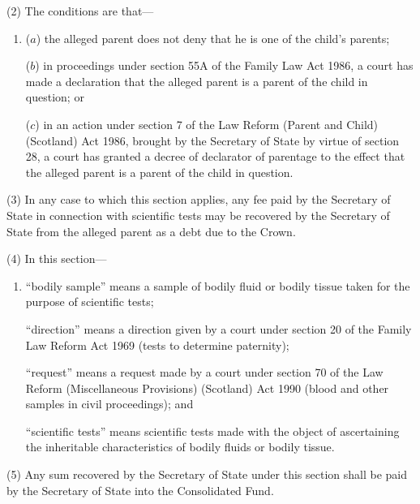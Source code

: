 \documentclass[12pt,a4paper]{article}
\begin{document}
(2) The conditions are that---
\begin{enumerate}\item[]
($a$)
the alleged parent does not deny that he is one of the child’s parents;

($b$)
in proceedings under section 55A of the Family Law Act 1986, a court has made a declaration that the alleged parent is a parent of the child in question;
or

($c$)
in an action under section 7 of the Law Reform (Parent and Child) (Scotland) Act 1986, brought by the Secretary of State by virtue of section 28, a court has granted a decree of declarator of parentage to the effect that the alleged parent is a parent of the child in question.
\end{enumerate}

(3) In any case to which this section applies, any fee paid by the Secretary of State in connection with scientific tests may be recovered by the Secretary of State from the alleged parent as a debt due to the Crown.

(4) In this section---
\begin{enumerate}\item[]
 “bodily sample” means a sample of bodily fluid or bodily tissue taken for the purpose of scientific tests; 

“direction” means a direction given by a court under section 20 of the Family Law Reform Act 1969 (tests to determine paternity); 

“request” means a request made by a court under section 70 of the Law Reform (Miscellaneous Provisions) (Scotland) Act 1990 (blood and other samples in civil proceedings); and 

“scientific tests” means scientific tests made with the object of ascertaining the inheritable characteristics of bodily fluids or bodily tissue.
\end{enumerate}

(5) Any sum recovered by the Secretary of State under this section shall be paid by the Secretary of State into the Consolidated Fund.
\end{document}
